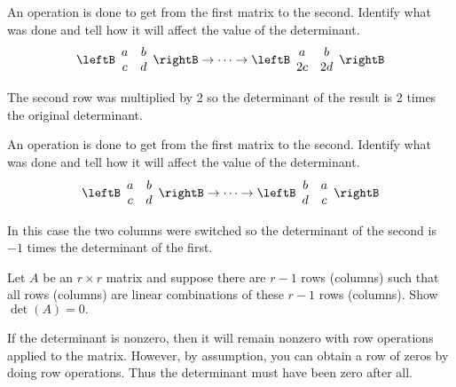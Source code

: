 \begin{enumialphparenastyle}
\begin{ex} An operation is done to get from the first matrix to the second.
Identify what was done and tell how it will affect the value of the
determinant. 
\begin{equation*}
\leftB
\begin{array}{cc}
a & b \\
c & d
\end{array}
\rightB \rightarrow \cdots \rightarrow \leftB
\begin{array}{cc}
a & b \\
2c & 2d
\end{array}
\rightB
\end{equation*}
\begin{sol}
The second row was multiplied by 2 so the determinant of the result is 2
times the original determinant.
\end{sol}
\end{ex}

\begin{ex} An operation is done to get from the first matrix to the second.
Identify what was done and tell how it will affect the value of the
determinant. 
\begin{equation*}
\leftB
\begin{array}{cc}
a & b \\
c & d
\end{array}
\rightB \rightarrow \cdots \rightarrow \leftB
\begin{array}{cc}
b & a \\
d & c
\end{array}
\rightB
\end{equation*}
\begin{sol}
In this case the two columns were switched so the determinant of the second
is $-1$ times the determinant of the first.
\end{sol}
\end{ex}


\begin{ex} Let $A$ be an $r\times r$ matrix and suppose there are $r-1$ rows
(columns) such that all rows (columns) are linear combinations of these $r-1$
rows (columns). Show $\det \left( A\right) =0.$ 
\begin{sol}
If the determinant is nonzero, then it will remain nonzero with row operations applied to the matrix.
However, by assumption, you can obtain a row of zeros by doing row
operations. Thus the determinant must have been zero after all.
\end{sol}
\end{ex}


\end{enumialphparenastyle}
